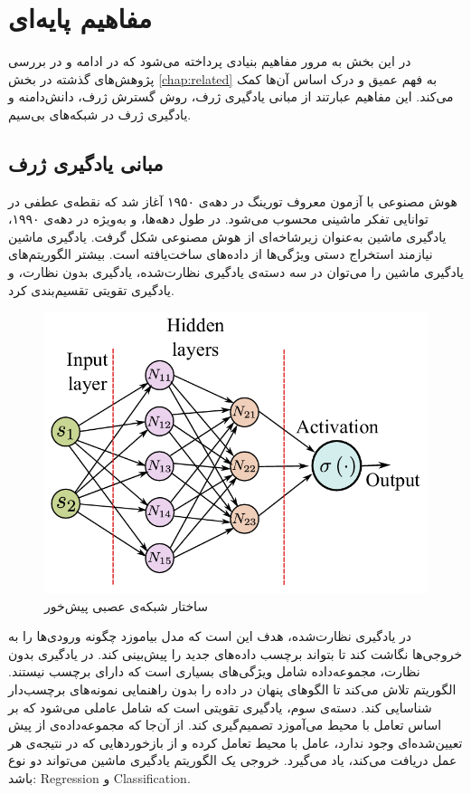 \chapter{مفاهیم پایه‌ای}
\label{chap:concepts}
در این بخش به مرور مفاهیم بنیادی پرداخته می‌شود که در ادامه و در بررسی پژوهش‌های گذشته در بخش 
\autoref{chap:related}
به فهم عمیق‌ و درک اساس آن‌ها کمک می‌کند. این مفاهیم عبارتند از مبانی یادگیری ژرف، روش گسترش ژرف، دانش‌دامنه و یادگیری ژرف در شبکه‌های بی‌سیم.
\section{مبانی یادگیری ژرف}
هوش مصنوعی با آزمون معروف تورینگ در دهه‌ی ۱۹۵۰ آغاز شد که نقطه‌ی عطفی در توانایی تفکر ماشینی محسوب می‌شود. در طول دهه‌ها، و به‌ویژه در دهه‌ی ۱۹۹۰، یادگیری ماشین به‌عنوان زیرشاخه‌ای از هوش مصنوعی شکل گرفت. یادگیری ماشین نیازمند استخراج دستی ویژگی‌ها از داده‌های ساخت‌یافته است. بیشتر الگوریتم‌های یادگیری ماشین را می‌توان در سه دسته‌ی یادگیری نظارت‌شده، یادگیری بدون نظارت، و یادگیری تقویتی تقسیم‌بندی کرد.
\begin{figure}
	\centering
	\includegraphics[width=0.5\linewidth]{./Pic/ComprehensiveReview_concepts_fig1}
	\caption[ ساختار شبکه‌ عصبی پیش‌خور]{ساختار شبکه‌ی عصبی پیش‌خور \cite{ComprehensiveReview}}
	\label{concepts:fig1}
\end{figure}
در یادگیری نظارت‌شده، هدف این است که مدل بیاموزد چگونه ورودی‌ها را به خروجی‌ها نگاشت کند تا بتواند برچسب داده‌های جدید را پیش‌بینی کند. در یادگیری بدون نظارت، مجموعه‌داده شامل ویژگی‌های بسیاری است که دارای برچسب نیستند. الگوریتم تلاش می‌کند تا الگوهای پنهان در داده را بدون راهنمایی نمونه‌های برچسب‌دار شناسایی کند. دسته‌ی سوم، یادگیری تقویتی است که شامل عاملی می‌شود که بر اساس تعامل با محیط می‌آموزد تصمیم‌گیری کند. از آن‌جا که مجموعه‌داده‌ی از پیش تعیین‌شده‌ای وجود ندارد، عامل با محیط تعامل کرده و از بازخوردهایی که در نتیجه‌ی هر عمل دریافت می‌کند، یاد می‌گیرد.
خروجی یک الگوریتم یادگیری ماشین می‌تواند دو نوع باشد: 
\gls{Regression}
 و 
\gls{Classification}.

